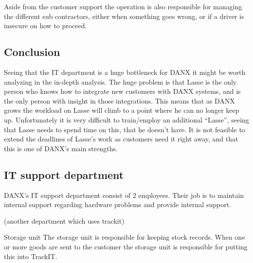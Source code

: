 Aside from the customer support the operation is also responsible for managing the different sub contractors, either when something goes wrong, or if a driver is insecure on how to proceed. 


\subsection{Conclusion}
Seeing that the IT department is a huge bottleneck for DANX it might be worth analyzing in the in-depth analysis. The huge problem is that Lasse is the only person who knows how to integrate new customers with DANX systems, and is the only person with insight in those integrations. This means that as DANX grows the workload on Lasse will climb to a point where he can no longer keep up.
Unfortunately it is very difficult to train/employ an additional “Lasse”, seeing that Lasse needs to spend time on this, that he doesn’t have. It is not feasible to extend the deadlines of Lasse’s work as customers need it right away, and that this is one of DANX’s main strengths. 

\subsection{IT support department}
DANX’s IT support department consist of 2 employees. Their job is to maintain internal support regarding hardware problems and provide internal support.



(another department which uses trackit)

Storage unit
The storage unit is responsible for keeping stock records. When one or more goods are sent to the customer the storage unit is responsible for putting this into TrackIT.